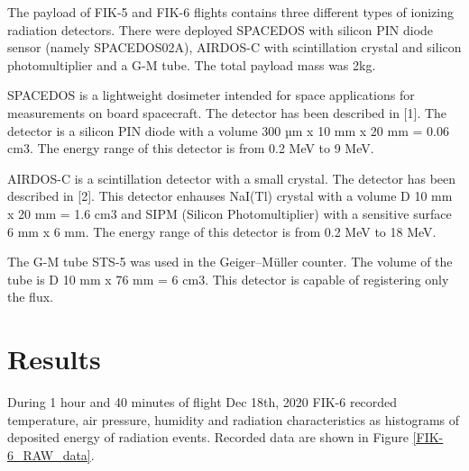\documentclass{Rpd}
\begin{document}
The payload of FIK-5 and FIK-6 flights contains three different types of ionizing radiation detectors. There were deployed SPACEDOS with silicon PIN diode sensor (namely SPACEDOS02A), AIRDOS-C with scintillation crystal and silicon photomultiplier and a G-M tube. The total payload mass was 2kg.

SPACEDOS is a lightweight dosimeter intended for space applications for measurements on board spacecraft. The detector has been described in [1]. The detector is a silicon PIN diode with a volume 300 µm x 10 mm x 20 mm = 0.06 cm3. The energy range of this detector is from 0.2 MeV to 9 MeV.

AIRDOS-C is a scintillation detector with a small crystal. The detector has been described in [2]. This detector enhauses NaI(Tl) crystal with a volume D 10 mm x 20 mm = 1.6 cm3 and SIPM (Silicon Photomultiplier) with a sensitive surface 6 mm x 6 mm.  The energy range of this detector is from 0.2 MeV to 18 MeV.

The G-M tube STS-5 was used in the Geiger–Müller counter. The volume of the tube is D 10 mm x 76 mm = 6 cm3. This detector is capable of registering only the flux.

\section{Results}

During 1 hour and 40 minutes of flight Dec 18th, 2020 FIK-6 recorded temperature, air pressure, humidity and radiation characteristics as histograms of deposited energy of radiation events. Recorded data are shown in Figure \ref{FIK-6_RAW_data}.
\end{document}
